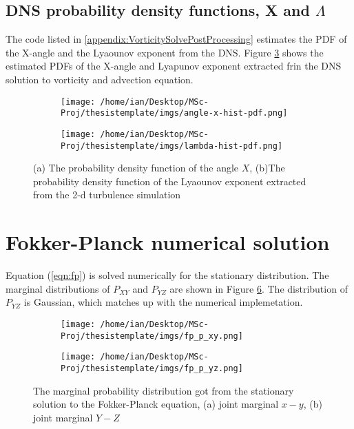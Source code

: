 \subsection{DNS probability density functions, X and $\Lambda$} \label{sec:l_pdf}

The code listed in \ref{appendix:VorticitySolvePostProcessing} estimates the PDF of the X-angle and the Lyaounov exponent from the DNS. Figure \ref{fig:dns-pdfs} shows the estimated PDFs of the 
X-angle and Lyapunov exponent extracted frin the DNS solution to vorticity and advection equation.

\begin{figure}[ht]
\begin{subfigure}{.5\textwidth}
  \centering
  \texttt{[image: /home/ian/Desktop/MSc-Proj/thesistemplate/imgs/angle-x-hist-pdf.png]}
  \caption{}
  \label{fig:sub2_dns-pdfs}
\end{subfigure}
\begin{subfigure}{.5\textwidth}
  \centering
  \texttt{[image: /home/ian/Desktop/MSc-Proj/thesistemplate/imgs/lambda-hist-pdf.png]}
  \caption{}
  \label{fig:sub1_dns-pdfs}
\end{subfigure}
\caption{(a) The probability density function of the angle $X$, (b)The probability density function of the Lyaounov exponent extracted from the 2-d turbulence simulation}
\label{fig:dns-pdfs}
\end{figure}


\section{Fokker-Planck numerical solution} \label{sec:l_pdf}	
Equation (\ref{eqn:fp}) is solved numerically for the stationary distribution. The marginal distributions of $P_{XY}$ and $P_{YZ}$ are shown in Figure \ref{fig:fp-marginals}.
The distribution of $P_{YZ}$ is Gaussian, which matches up with the numerical implemetation.

\begin{figure}[ht]
\begin{subfigure}{.5\textwidth}
  \centering
  \texttt{[image: /home/ian/Desktop/MSc-Proj/thesistemplate/imgs/fp\_p\_xy.png]}
  \caption{}
  \label{}
\end{subfigure}
\begin{subfigure}{.5\textwidth}
  \centering
  \texttt{[image: /home/ian/Desktop/MSc-Proj/thesistemplate/imgs/fp\_p\_yz.png]}
  \caption{}
  \label{}
\end{subfigure}
\caption{The marginal probability distribution got from the stationary solution to the Fokker-Planck equation, (a) joint marginal $x-y$, (b) joint marginal $Y-Z$}
\label{fig:fp-marginals}
\end{figure}

